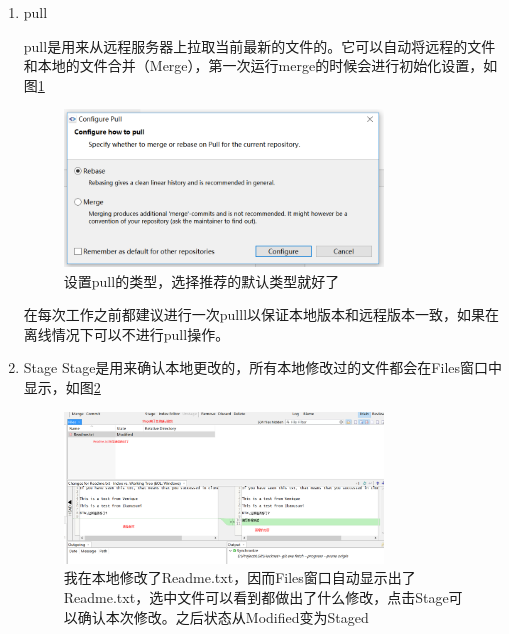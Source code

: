 \documentclass[10pt,a4paper,UTF8]{article}
\begin{document}
        \begin{enumerate}[(1)]
            \item pull

                pull是用来从远程服务器上拉取当前最新的文件的。它可以自动将远程的文件和本地的文件合并（Merge），第一次运行merge的时候会进行初始化设置，如图\ref{fig:pull_setting}
                \begin{figure}[H]
                    \centering
                    \includegraphics[width=0.8\textwidth]{pull.PNG}
                    \caption{设置pull的类型，选择推荐的默认类型就好了}
                    \label{fig:pull_setting}
                \end{figure}  

                在每次工作之前都建议进行一次pulll以保证本地版本和远程版本一致，如果在离线情况下可以不进行pull操作。

            \item Stage
                Stage是用来确认本地更改的，所有本地修改过的文件都会在Files窗口中显示，如图\ref{fig:stage}
                \begin{figure}[H]
                    \centering
                    \includegraphics[width=0.8\textwidth]{Stage.png}
                    \caption{我在本地修改了Readme.txt，因而Files窗口自动显示出了Readme.txt，选中文件可以看到都做出了什么修改，点击Stage可以确认本次修改。之后状态从Modified变为Staged}
                    \label{fig:stage}
                \end{figure}


\end{enumerate}
\end{document}
